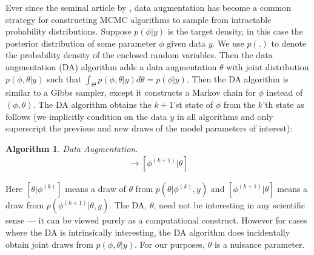 \documentclass{article}
\newtheorem{alg}{Algorithm}
\begin{document}
Ever since the seminal article by , data augmentation has become a common strategy for constructing MCMC algorithms to sample from intractable probability distributions. Suppose $p(\phi|y)$ is the target density, in this case the posterior distribution of some parameter $\phi$ given data $y$. We use $p(.)$ to denote the probability density of the enclosed random variables. Then the data augmentation (DA) algorithm adds a data augmentation $\theta$ with joint distribution $p(\phi,\theta|y)$ such that $\int_{\Theta}p(\phi,\theta|y)d\theta = p(\phi|y)$. Then the DA algorithm is similar to a Gibbs sampler, except it constructs a Markov chain for $\phi$ instead of $(\phi, \theta)$. The DA algorithm obtains the $k+1$'st state of $\phi$ from the $k$'th state as follows (we implicitly condition on the data $y$ in all algorithms and only superscript the previous and new draws of the model parameters of interest):
\begin{alg}Data Augmentation.\label{alg:DA}
  \begin{align*}
  [\theta|\phi^{(k)}] \to [\phi^{(k+1)}|\theta]
\end{align*}
\end{alg} 
\noindent Here $[\theta|\phi^{(k)}]$ means a draw of $\theta$ from $p(\theta|\phi^{(k)},y)$ and $[\phi^{(k+1)}|\theta]$ means a draw from $p(\phi^{(k+1)}|\theta,y)$. The DA, $\theta$, need not be interesting in any scientific sense --- it can be viewed purely as a computational construct. However for cases where the DA is intrinsically interesting, the DA algorithm does incidentally obtain joint draws from $p(\phi,\theta|y)$. For our purposes, $\theta$ is a nuisance parameter.
\end{document}
